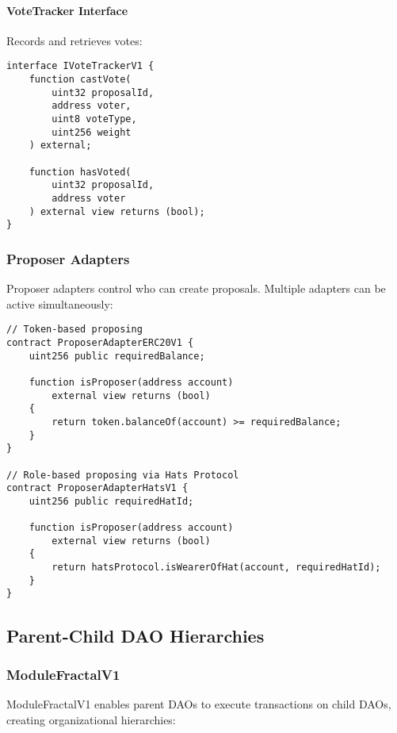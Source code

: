 \documentclass[11pt,a4paper]{article}
\begin{document}
\paragraph{VoteTracker Interface} Records and retrieves votes:

\begin{lstlisting}[caption=VoteTracker Interface]
interface IVoteTrackerV1 {
    function castVote(
        uint32 proposalId,
        address voter,
        uint8 voteType,
        uint256 weight
    ) external;

    function hasVoted(
        uint32 proposalId,
        address voter
    ) external view returns (bool);
}
\end{lstlisting}

\subsubsection{Proposer Adapters}

Proposer adapters control who can create proposals. Multiple adapters can be active simultaneously:

\begin{lstlisting}[caption=Proposer Adapter Examples]
// Token-based proposing
contract ProposerAdapterERC20V1 {
    uint256 public requiredBalance;

    function isProposer(address account)
        external view returns (bool)
    {
        return token.balanceOf(account) >= requiredBalance;
    }
}

// Role-based proposing via Hats Protocol
contract ProposerAdapterHatsV1 {
    uint256 public requiredHatId;

    function isProposer(address account)
        external view returns (bool)
    {
        return hatsProtocol.isWearerOfHat(account, requiredHatId);
    }
}
\end{lstlisting}

\subsection{Parent-Child DAO Hierarchies}

\subsubsection{ModuleFractalV1}

ModuleFractalV1 enables parent DAOs to execute transactions on child DAOs, creating organizational hierarchies:
\end{document}
